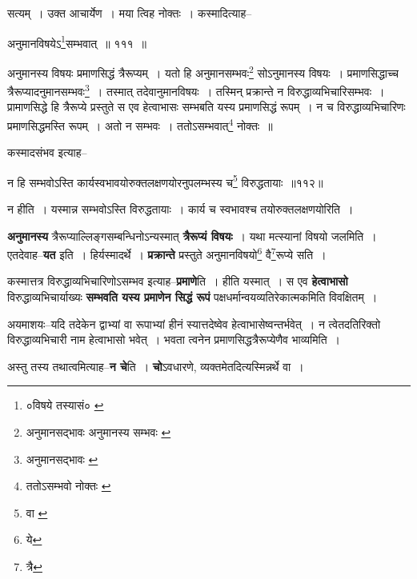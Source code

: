 \documentclass[article,12pt,a4paper]{memoir}
\begin{document}
	  \pstart सत्यम् । उक्त आचार्येण । मया त्विह नोक्तः । कस्मादित्याह--
	\pend
       
	  \bigskip
	  \begingroup
	

	  \pstart अनुमानविषयेऽ\footnote{०विषये तस्यासं० \cite{dp-msC}}सम्भवात् ॥ १११ ॥
	\pend
      
	  \endgroup
	 

	  \pstart अनुमानस्य विषयः प्रमाणसिद्धं त्रैरूप्यम् । यतो हि अनुमानसम्भवः\footnote{अनुमानसद्भावः \cite{dp-msA} \cite{dp-msB} \cite{dp-msC} \cite{dp-edP} \cite{dp-edH} \cite{dp-edN} अनुमानस्य सम्भवः \cite{dp-edE}} सोऽनुमानस्य विषयः । प्रमाणसिद्धाच्च त्रैरूप्यादनुमानसम्भवः\footnote{अनुमानसद्भावः \cite{dp-msA} \cite{dp-msB} \cite{dp-edP} \cite{dp-edH} \cite{dp-edN}} । तस्मात् तदेवानुमानविषयः । तस्मिन् प्रक्रान्ते न विरुद्धाव्यभिचारिसम्भवः । प्रामाणसिद्धे हि त्रैरूप्ये प्रस्तुते स एव हेत्वाभासः सम्भबति यस्य प्रमाणसिद्धं रूपम् । न च विरुद्धाव्यभिचारिणः प्रमाणसिद्धमस्ति रूपम् । अतो न सम्भवः । ततोऽसम्भवात्\footnote{ततोऽसम्भवो नोक्तः \cite{dp-msA} \cite{dp-msB} \cite{dp-edP} \cite{dp-edH}} नोक्तः ॥
	\pend
       

	  \pstart कस्मादसंभव इत्याह--
	\pend
       
	  \bigskip
	  \begingroup
	

	  \pstart न हि सम्भवोऽस्ति कार्यस्वभावयोरुक्तलक्षणयोरनुपलम्भस्य च\footnote{वा \cite{dp-msD}} विरुद्धतायाः ॥११२॥
	\pend
      
	  \endgroup
	 

	  \pstart न हीति । यस्मान्न सम्भवोऽस्ति विरुद्धतायाः । कार्य च स्वभावश्च तयोरुक्तलक्षणयोरिति ।
	\pend
      
	  \endgroup
	

	  \pstart \textbf{अनुमानस्य} त्रैरूप्याल्लिङ्गसम्बन्धिनोऽन्यस्मात् \textbf{त्रैरूप्यं विषयः} । यथा मत्स्यानां विषयो जलमिति । एतदेवाह--\textbf{यत} इति । हिर्यस्मादर्थे । \textbf{प्रक्रान्ते} प्रस्तुते अनुमानविषयो\footnote{ये} वै\footnote{त्रै}रूप्ये सति ।
	\pend
      

	  \pstart कस्मात्तत्र विरुद्धाव्यभिचारिणोऽसम्भव इत्याह--\textbf{प्रमाणे}ति । हीति यस्मात् । स एव \textbf{हेत्वाभासो} विरुद्धाव्यभिचार्याख्यः \textbf{सम्भवति यस्य प्रमाणेन सिद्धं रूपं} पक्षधर्मान्वयव्यतिरेकात्मकमिति विवक्षितम् ।
	\pend
      

	  \pstart अयमाशयः--यदि तदेकेन द्वाभ्यां वा रूपाभ्यां हीनं स्यात्तदेष्वेव हेत्वाभासेष्वन्तर्भवेत् । न त्वेतदतिरिक्तो विरुद्धाव्यभिचारी नाम हेत्वाभासो भवेत् । भवता त्वनेन प्रमाणसिद्धत्रैरूप्येणैव भाव्यमिति ।
	\pend
      

	  \pstart अस्तु तस्य तथात्वमित्याह--\textbf{न चे}ति । \textbf{चो}ऽवधारणे, व्यक्तमेतदित्यस्मिन्नर्थे वा ।
	\pend
      
\end{document}
